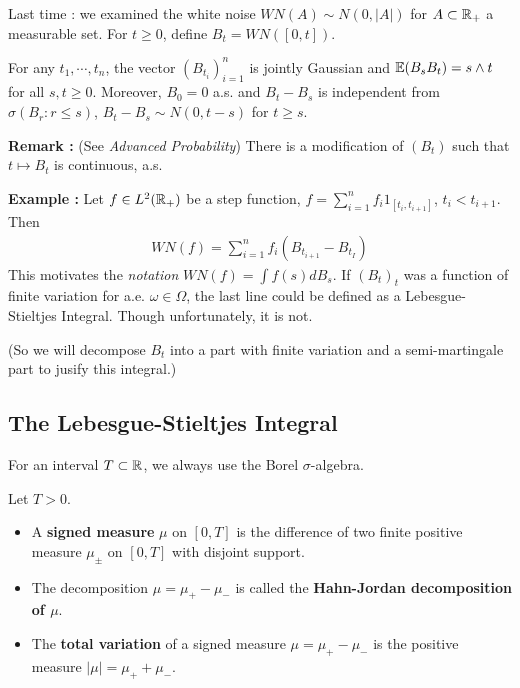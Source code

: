\documentclass[12pt,a4paper]{article}
\renewenvironment{i}
{\begin{itemize} 
	}%
	{\end{itemize}
}
\begin{document}
Last time : we examined the white noise $WN(A)\sim N(0, |A|)$ for $A\subset \mathbb{R}_+$ a measurable set. For $t\geq 0$, define $B_t = WN([0, t])$.
\s

\fact For any $t_1, \cdots, t_n$, the vector $(B_{t_i})_{i=1}^n$ is jointly Gaussian and $\mathbb{E}(B_s B_t) = s\wedge t$ for all $s,t\geq 0$. Moreover, $B_0 =0$ a.s. and $B_t -B_s$ is independent from $\sigma(B_r : r\leq s)$, $B_t - B_s \sim N(0, t-s)$ for $t\geq s$.
\s

\textbf{Remark :} (See \emph{Advanced Probability}) There is a modification of $(B_t)$ such that $t\mapsto B_t$ is continuous, a.s.
\s

\textbf{Example :} Let $f\in L^2(\mathbb{R}_+)$ be a step function, $f = \sum_{i=1}^n f_i 1_{[t_i, t_{i+1}]}$, $t_i < t_{i+1}$. Then
\begin{align*}
WN(f) = \sum_{i=1}^n f_i (B_{t_{i+1}} - B_{t_I})
\end{align*}
This motivates the \emph{notation} $WN(f)  = \int f(s)dB_s$. If $(B_t)_t$ was a function of finite variation for a.e. $\omega \in \Omega$, the last line could be defined as a Lebesgue-Stieltjes Integral. Though unfortunately, it is not.

\quad (So we will decompose $B_t$ into a part with finite variation and a semi-martingale part to jusify this integral.)

\subsection{The Lebesgue-Stieltjes Integral}

For an interval $T\subset \mathbb{R}$, we always use the Borel $\sigma$-algebra.
\s

 Let $T>0$.
\begin{i}
\item A \textbf{signed measure} $\mu$ on $[0, T]$ is the difference of two finite positive measure $\mu_{\pm}$ on $[0, T]$ with disjoint support.
\item The decomposition $\mu = \mu_+ - \mu_-$ is called the \textbf{Hahn-Jordan decomposition of $\mu$}.
\item The \textbf{total variation} of a signed measure $\mu = \mu_+ - \mu_-$ is the positive measure $|\mu| = \mu_+ + \mu_-$.
\end{i}
\s
\end{document}
